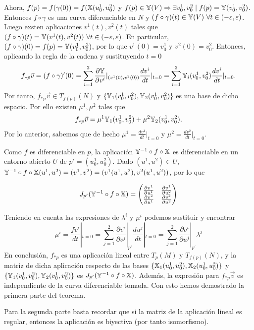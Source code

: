 \documentclass[twoside]{report}
\begin{document}
\begin{dem}
Ahora, $f(p)=f(\gamma(0))=f(\mathbb{X}(u^1_0,u^2_0)$ y $f(p)\in\mathbb{Y}(V)\Rightarrow\exists v^1_0, v^2_0\mid f(p)=\mathbb{Y}(v^1_0,v^2_0)$. Entonces $f\circ\gamma$ es una curva diferenciable en $N$ y $(f\circ\gamma)(t)\in\mathbb{Y}(V)\ \forall t\in(-\varepsilon,\varepsilon)$. Luego exsten aplicaciones $v^1(t),v^2(t)$ tales que $(f\circ\gamma)(t)=\mathbb{Y}(v^1(t),v^2(t))\ \forall t\in(-\varepsilon,\varepsilon)$. En particular, $(f\circ\gamma)(0)=f(p)=\mathbb{Y}(v^1_0,v^2_0)$, por lo que $v^1(0)=v^1_0$ y $v^2(0)=v^2_0$. Entonces, aplicando la regla de la cadena y sustituyendo $t=0$
$$f_{*p}\vec{v}=(f\circ\gamma)'(0)=\sum_{i=1}^2\frac{\partial\mathbb{Y}}{\partial v^i}|_{(v^1(0),v^2(0))}\frac{dv^i}{dt}|_{t=0}=\sum_{i=1}^2\mathbb{Y}_i(v^1_0,v^2_0)\frac{dv^i}{dt}|_{t=0}.$$
Por tanto, $f_{*p}\vec{v}\in T_{f(p)}(N)$ y $\{\mathbb{Y}_1(v^1_0,v^2_0),\mathbb{Y}_2(v^1_0,v^2_0)\}$ es una base de dicho espacio. Por ello existen $\mu^1,\mu^2$ tales que $$f_{*p}\vec{v}=\mu^1\mathbb{Y}_1(v^1_0,v^2_0)+\mu^2\mathbb{Y}_2(v^1_0,v^2_0).$$
Por lo anterior, sabemos que de hecho $\mu^1=\frac{dv^1}{dt}|_{t=0}$ y $\mu^2=\frac{dv^2}{dt}|_{t=0}$.

Como $f$ es diferenciable en $p$, la aplicación $\mathbb{Y}^{-1}\circ f\circ\mathbb{X}$ es diferenciable en un entorno abierto $\overline{U}$ de $p'=(u^1_0,u^2_0)$. Dado $(u^1,u^2)\in\overline{U}$, $\mathbb{Y}^{-1}\circ f\circ\mathbb{X}(u^1,u^2)=(v^1,v^2)=(v^1(u^1,u^2),v^2(u^1,u^2))$, por lo que

$$J_{p'}(\mathbb{Y}^{-1}\circ f\circ\mathbb{X})=\begin{pmatrix}
\frac{\partial v^1}{\partial u^1} & \frac{\partial v^1}{\partial u^2}\\
\frac{\partial v^2}{\partial u^1} & \frac{\partial v^2}{\partial u^2}
\end{pmatrix}$$

Teniendo en cuenta las expresiones de $\lambda^i$ y $\mu^i$ podemos sustituir y encontrar
$$\mu^i=\frac{fv^i}{dt}|_{t=0}=\sum_{j=1}^2\frac{\partial v^i}{\partial v^j}|_{p'}\frac{du^j}{dt}|_{t=0}=\sum_{j=1}^2\frac{\partial v^i}{\partial u^j}|_{p'}\lambda^j$$
En conclusión, $f_{*p}$ es una aplicación lineal entre $T_p(M)$ y $T_{f(p)}(N)$, y la matriz de dicha aplicación respecto de las bases $\{\mathbb{X}_1(u^1_0,u^2_0),\mathbb{X}_2(u^1_0, u^2_0)\}$ y $\{\mathbb{Y}_1(v^1_0,v^2_0),\mathbb{Y}_2(v^1_0,v^2_0)\}$ es $J_{p'}(\mathbb{Y}^{-1}\circ f\circ\mathbb{X})$. Además, la expresión para $f_{*p}\vec{v}$ es independiente de la curva diferenciable tomada. Con esto hemos demostrado la primera parte del teorema.

Para la segunda parte basta recordar que si la matriz de la aplicación lineal es regular, entonces la aplicación es biyectiva (por tanto isomorfismo). \QED

\end{dem}
\end{document}
